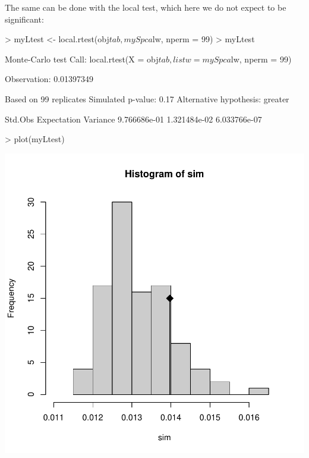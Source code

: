 \documentclass{article}
\begin{document}
The same can be done with the local test, which here we do not expect
to be significant:
\begin{Schunk}
\begin{Sinput}
> myLtest <- local.rtest(obj$tab, mySpca$lw, nperm = 99)
> myLtest
\end{Sinput}
\begin{Soutput}
Monte-Carlo test
Call: local.rtest(X = obj$tab, listw = mySpca$lw, nperm = 99)

Observation: 0.01397349 

Based on 99 replicates
Simulated p-value: 0.17 
Alternative hypothesis: greater 

     Std.Obs  Expectation     Variance 
9.766686e-01 1.321484e-02 6.033766e-07 
\end{Soutput}
\begin{Sinput}
> plot(myLtest)
\end{Sinput}
\end{Schunk}
\includegraphics{figs/spca-localrtest}
~\\
\end{document}

